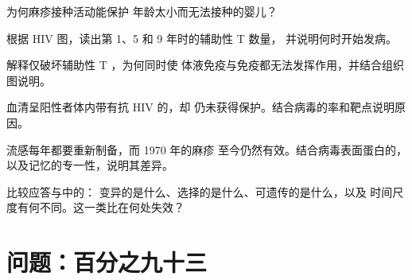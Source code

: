 \begin{exercise}[$\star\star$]\label{exo:g12:adaptive-immunity:10}
为何麻疹接种活动能保护
年龄太小而无法接种的婴儿？
\end{exercise}

\begin{exercise}[$\star\star$]\label{exo:g12:adaptive-immunity:11}
根据 HIV 图，读出第 1、5 和 9 年时的辅助性 T 数量，
并说明何时开始发病。
\end{exercise}

\begin{exercise}[$\star\star\star$]\label{exo:g12:adaptive-immunity:12}
解释仅破坏辅助性 T ，为何同时使
体液免疫与免疫都无法发挥作用，并结合组织图说明。
\end{exercise}

\begin{exercise}[$\star\star\star$]\label{exo:g12:adaptive-immunity:13}
血清呈阳性者体内带有抗 HIV 的，却
仍未获得保护。结合病毒的率和靶点说明原因。
\end{exercise}

\begin{exercise}[$\star\star\star$]\label{exo:g12:adaptive-immunity:14}
流感每年都要重新制备，而 1970 年的麻疹
至今仍然有效。结合病毒表面蛋白的，
以及记忆的专一性，说明其差异。
\end{exercise}

\begin{exercise}[$\star\star\star$]\label{exo:g12:adaptive-immunity:15}
比较应答与中的：
变异的是什么、选择的是什么、可遗传的是什么，以及
时间尺度有何不同。这一类比在何处失效？
\end{exercise}

\section{问题：百分之九十三}

